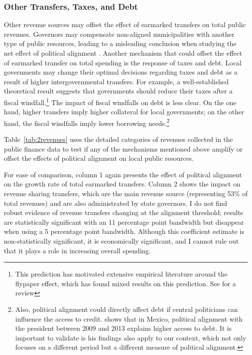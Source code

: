 \documentclass[dv_diss_main.tex]{subfiles}
\begin{document}
\subsubsection{Other Transfers, Taxes, and Debt} Other revenue sources may offset the effect of earmarked transfers on total public revenues. Governors may compensate non-aligned municipalities with another type of public resources, leading to a misleading conclusion when studying the net effect of political alignment   \cite{kramon2013benefits}. 
Another mechanism that could offset the effect of earmarked transfer on total spending is the response of taxes and debt.
Local governments may change their optimal decisions regarding taxes and debt as a result of higher intergovernmental transfers.  
For example, a well-established theoretical result suggests that governments should reduce their taxes after a fiscal windfall.\footnote{
This prediction has motivated extensive empirical literature around the flypaper effect, which has found mixed results on this prediction. See \cite{inman2008flypaper} for a review} The impact of fiscal windfalls on debt is less clear. On the one hand, higher transfers imply higher collateral for local governments; on the other hand, the fiscal windfalls imply lower borrowing needs.\footnote{Also, political alignment could directly affect debt if central politicians can influence the access to credit. \cite{de2020political} shows that in Mexico, political alignment with the president between 2009 and 2013 explains higher access to debt. It is important to validate is his findings also apply to our context, which not only focuses on a different period but a different measure of political alignment.}  

Table~\ref{tab:2revenues} uses the detailed categories of revenues collected in the public finance data to test if any of the mechanisms mentioned above amplify or offset the effects of political alignment on local public resources. 

For ease of comparison, column 1 again presents the effect of political alignment on the growth rate of total earmarked transfers. Column 2 shows the impact on revenue sharing transfers, which are the main revenue source (representing 53\% of total revenues) and are also administrated by state governors. I do not find robust evidence of revenue transfers changing at the alignment threshold; results are statistically significant with an 11 percentage point bandwidth but disappear when using a 5 percentage point bandwidth. Although this coefficient estimate is non-statistically significant, it is economically significant, and I cannot rule out that it plays a role in increasing overall spending. 
\end{document}
